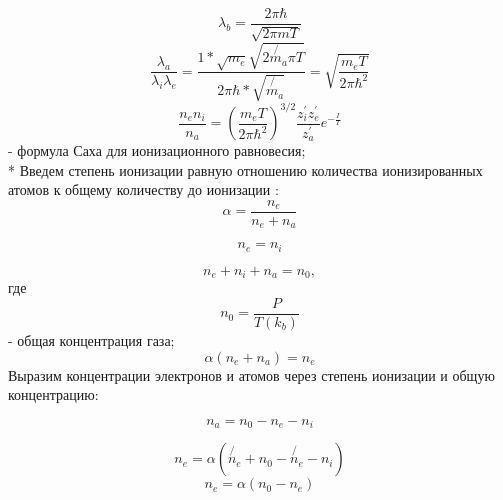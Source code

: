 \documentclass[letterpaper,12pt]{article}
\begin{document}
\begin{equation} \label{eq:aperp} %
\lambda_b= \frac{2 \pi \hbar}{\sqrt{2 \pi m T}}
\end{equation}
\begin{equation} \label{eq:aperp} %
\frac{\lambda_a}{\lambda_i \lambda_e}=\frac{1* \sqrt{m_e} \sqrt{2 \not{m_a} \pi T}}{2 \pi \hbar * \sqrt{\not{m_a}}}= \sqrt{\frac{m_eT}{2 \pi \hbar^2}}
\end{equation}
\begin{equation} \label{eq:aperp} %
\frac{n_e n_i}{n_a} = (\frac{m_eT}{2 \pi \hbar^2})^{3/2}\frac{z_{i}^{'}z_{e}^{'}}{z_{a}^{'}}e^{-\frac{I}{T}}
\end{equation}
- формула Саха для ионизационного равновесия;
\\*
Введем степень ионизации равную отношению количества ионизированных атомов к общему количеству до ионизации :
\begin{equation} \label{eq:aperp} %
\alpha= \frac{n_e}{n_e+n_a}
\end{equation}

\begin{equation} \label{eq:aperp} %
n_e = n_i
\end{equation}

\begin{equation} \label{eq:aperp} %
n_e + n_i + n_a = n_0,
\end{equation}
где
\begin{equation} \label{eq:aperp} %
n_0=\frac{P}{T(k_b)}
\end{equation}
- общая концентрация газа;
\begin{equation} \label{eq:aperp} %
\alpha(n_e+n_a)=n_e
\end{equation}
Выразим концентрации электронов и атомов через степень ионизации и общую концентрацию:

\begin{equation} \label{eq:aperp} %
n_a=n_0-n_e-n_i
\end{equation}

\begin{equation} \label{eq:aperp} %
n_e =\alpha(\not{n_e} + n_0 - \not{n_e} - n_i)
\end{equation}
\begin{equation} \label{eq:aperp} %
n_e = \alpha(n_0 - n_e)
\end{equation}
\end{document}
